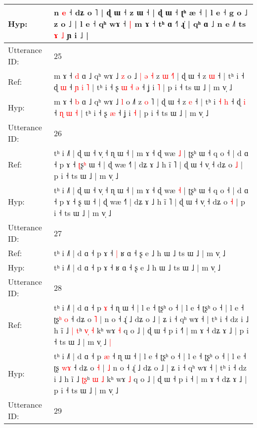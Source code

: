 \documentclass[10pt]{article}
\DeclareRobustCommand{\hl}[1]{{\textcolor{red}{#1}}}
\begin{document}
\begin{longtable}{ll}
 \\
Hyp: & n \hl{}\hl{e} ˧ dʑ o ˥ | ɖ ɯ ˧ z ɯ ˧ | ɖ ɯ ˧ ʈ\hl{}ʰ æ ˧\hl{} | l e ˧ g o ˩ z o ˩ | l e ˧ qʰ wɤ ˧\hl{ }\hl{|} m ɤ ˧ tʰ ɑ ˧\hl{˥} ɻ̍\hl{}\hl{} | qʰ ɑ ˩ n e ˩˥\hl{}\hl{} ts \hl{ɤ} \hl{˩} ɲ i ˩ |
 \\
\midrule
Utterance ID: & 25 \\
Ref: & m ɤ ˧ \hl{d} ɑ ˩ qʰ wɤ ˩ \hl{z} o ˩\hl{ }\hl{|}\hl{ }\hl{ə}\hl{ }\hl{˧} z \hl{ɯ} \hl{˧}˥ | ɖ ɯ ˧ z \hl{ɯ} ˧ | tʰ i\hl{}\hl{}\hl{}\hl{} ˧ ɖ \hl{ɯ} ˧ \hl{ɲ} \hl{i} \hl{˥} | tʰ i ˧ ʂ\hl{ }\hl{ɯ}\hl{ }\hl{˧} \hl{ə} ˧ ʝ i \hl{˥} | p i ˧ ts ɯ ˩ | m v̩ ˩
 \\
Hyp: & m ɤ ˧ \hl{b} ɑ ˩ qʰ wɤ ˩ \hl{l} o ˩\hl{}\hl{}\hl{}\hl{}\hl{}\hl{˥} z \hl{o} \hl{}˥ | ɖ ɯ ˧ z \hl{e} ˧ | tʰ i\hl{ }\hl{˧}\hl{ }\hl{h} ˧ ɖ \hl{i} ˧ \hl{ɳ} \hl{ɯ} \hl{˧} | tʰ i ˧ ʂ\hl{}\hl{}\hl{}\hl{} \hl{æ} ˧ ʝ i \hl{˧} | p i ˧ ts ɯ ˩ | m v̩ ˩
 \\
\midrule
Utterance ID: & 26 \\
Ref: & tʰ i ˩˥ | ɖ ɯ ˧ v̩ ˧ ɳ ɯ ˧ | m ɤ ˧ ɖ wæ \hl{˩} | ʈʂʰ ɯ ˧ q o ˧ | d ɑ ˧ p ɤ ˧ \hl{ʈ}ʂ\hl{ʰ} ɯ ˧ | ɖ wæ ˧˥ | dʑ ɤ ˩ h ĩ ˥ | ɖ ɯ ˧ v̩ ˧ dʑ o \hl{˩} | p i ˧ ts ɯ ˩ | m v̩ ˩
 \\
Hyp: & tʰ i ˩˥ | ɖ ɯ ˧ v̩ ˧ ɳ ɯ ˧ | m ɤ ˧ ɖ wæ \hl{˧} | ʈʂʰ ɯ ˧ q o ˧ | d ɑ ˧ p ɤ ˧ \hl{}ʂ\hl{} ɯ ˧ | ɖ wæ ˧˥ | dʑ ɤ ˩ h ĩ ˥ | ɖ ɯ ˧ v̩ ˧ dʑ o \hl{˧} | p i ˧ ts ɯ ˩ | m v̩ ˩
 \\
\midrule
Utterance ID: & 27 \\
Ref: & tʰ i ˩˥ | d ɑ ˧ p ɤ ˧\hl{ }\hl{|} ʁ ɑ ˧ ʂ e ˩ h ɯ ˩ ts ɯ ˩ | m v̩ ˩
 \\
Hyp: & tʰ i ˩˥ | d ɑ ˧ p ɤ ˧\hl{}\hl{} ʁ ɑ ˧ ʂ e ˩ h ɯ ˩ ts ɯ ˩ | m v̩ ˩
 \\
\midrule
Utterance ID: & 28 \\
Ref: & tʰ i ˩˥ | d ɑ ˧ p \hl{ɤ} ˧ ɳ ɯ ˧ | l e ˧ ʈʂʰ o ˧ | l e ˧ ʈʂʰ o ˧ | l e ˧ ʈʂ\hl{ʰ}\hl{ }\hl{o} ˧ dʑ o \hl{˥} |\hl{}\hl{} n o ˧ ɻ̍ ˩ dʑ o ˩ | ʑ i ˧ qʰ wɤ ˧ | tʰ i ˧ dz i ˩ h ĩ ˩ \hl{|}\hl{ }\hl{t}ʰ \hl{v}\hl{̩} \hl{˧} kʰ wɤ \hl{˧} q o ˩ | ɖ ɯ ˧ p i ˧\hl{˥} | m ɤ ˧ dʑ ɤ ˩ | p i ˧ ts ɯ ˩ | m v̩ ˩\hl{ }\hl{|}
 \\
Hyp: & tʰ i ˩˥ | d ɑ ˧ p \hl{æ} ˧ ɳ ɯ ˧ | l e ˧ ʈʂʰ o ˧ | l e ˧ ʈʂʰ o ˧ | l e ˧ ʈʂ\hl{ }\hl{w}\hl{ɤ} ˧ dʑ o \hl{˧} |\hl{ }\hl{˩} n o ˧ ɻ̍ ˩ dʑ o ˩ | ʑ i ˧ qʰ wɤ ˧ | tʰ i ˧ dz i ˩ h ĩ ˩ \hl{}\hl{ʈ}\hl{ʂ}ʰ \hl{}\hl{ɯ} \hl{˩} kʰ wɤ \hl{˩} q o ˩ | ɖ ɯ ˧ p i ˧\hl{} | m ɤ ˧ dʑ ɤ ˩ | p i ˧ ts ɯ ˩ | m v̩ ˩\hl{}\hl{}
 \\
\midrule
Utterance ID: & 29 \\

\end{longtable}
\end{document}
